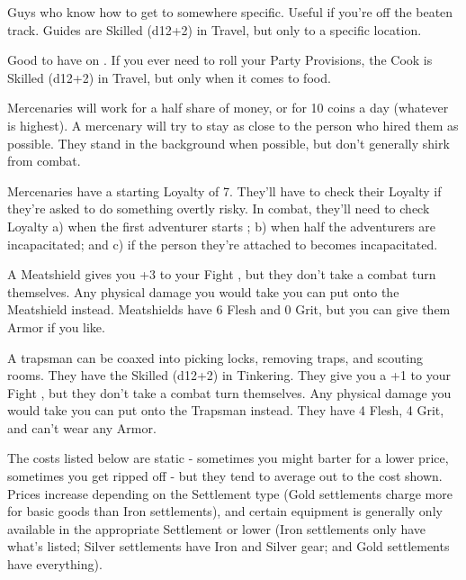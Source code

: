 {\begin{multicols}{2}

    Guys who know how to get to somewhere specific. Useful if you're  off the beaten track. Guides are Skilled (d12+2) in Travel, but only to a specific location.


    Good to have on .  If you ever need to roll your Party Provisions, the Cook is Skilled (d12+2) in Travel, but only when it comes to food.

    \cbreak


    Mercenaries will work for a half share of money, or for 10 coins a day (whatever is highest).  A mercenary will try to stay as close to the person who hired them as possible.  They stand in the background when possible, but don't generally shirk from combat.

    Mercenaries have a starting Loyalty of 7. They'll have to check their Loyalty if they're asked to do something overtly risky.  In combat, they'll need to check Loyalty a) when the first adventurer starts ; b) when half the adventurers are incapacitated; and c) if the person they're attached to becomes incapacitated.


    A Meatshield gives you +3 to your Fight \RO, but they don't take a combat turn themselves.  Any physical damage you would take you can put onto the Meatshield instead.  Meatshields have 6 Flesh and 0 Grit, but you can give them Armor if you like.


    A trapsman can be coaxed into picking locks, removing traps, and scouting rooms.  They have the Skilled (d12+2) in Tinkering.  They give you a +1 to your Fight \RO, but they don't take a combat turn themselves.  Any physical damage you would take you can put onto the Trapsman instead.  They have 4 Flesh, 4 Grit, and can't wear any Armor.

\newpage

\end{multicols}


  The costs listed below are static - sometimes you might barter for a lower price, sometimes you get ripped off - but they tend to average out to the cost shown.   Prices increase depending on the Settlement type (Gold settlements charge more for basic goods than Iron settlements), and certain equipment is generally only available in the appropriate Settlement or lower (Iron settlements only have what's listed; Silver settlements have Iron and Silver gear; and Gold settlements have everything). 

}
